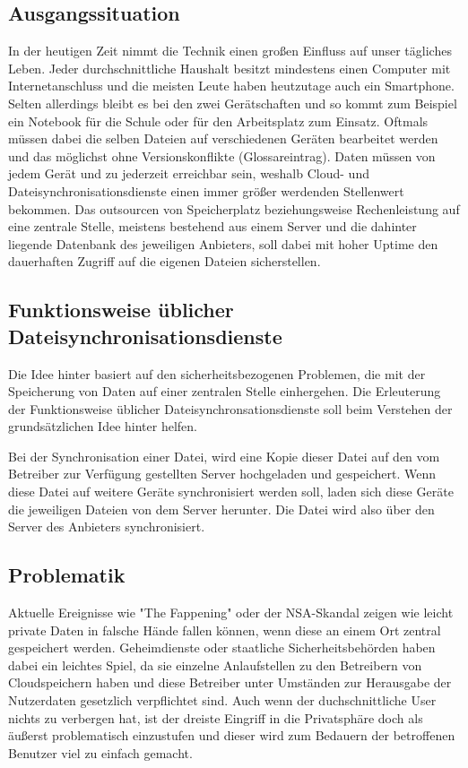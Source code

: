 \subsection{Ausgangssituation}
In der heutigen Zeit nimmt die Technik einen großen Einfluss auf unser tägliches Leben. Jeder durchschnittliche Haushalt besitzt mindestens
einen Computer mit Internetanschluss und die meisten Leute haben heutzutage auch ein Smartphone. Selten allerdings bleibt es bei den zwei
Gerätschaften und so kommt zum Beispiel ein Notebook für die Schule oder für den Arbeitsplatz zum Einsatz. Oftmals müssen dabei die selben
Dateien auf verschiedenen Geräten bearbeitet werden und das möglichst ohne Versionskonflikte (Glossareintrag). Daten müssen von
jedem Gerät und zu jederzeit erreichbar sein, weshalb Cloud- und Dateisynchronisationsdienste einen immer größer werdenden Stellenwert
bekommen. Das outsourcen von Speicherplatz beziehungsweise Rechenleistung auf eine zentrale Stelle, meistens bestehend aus einem Server
und die dahinter liegende Datenbank des jeweiligen Anbieters, soll dabei mit hoher Uptime den dauerhaften Zugriff auf die eigenen Dateien sicherstellen. 

\subsection{Funktionsweise üblicher Dateisynchronisationsdienste}
Die Idee hinter \sblit basiert auf den sicherheitsbezogenen Problemen, die mit der Speicherung von Daten auf einer zentralen Stelle
einhergehen. Die Erleuterung der Funktionsweise üblicher Dateisynchronsationsdienste soll beim Verstehen der grundsätzlichen 
Idee hinter \sblit helfen.

Bei der Synchronisation einer Datei, wird eine Kopie dieser Datei auf den vom Betreiber zur Verfügung gestellten Server hochgeladen und gespeichert.
Wenn diese Datei auf weitere Geräte synchronisiert werden soll, laden sich diese Geräte die jeweiligen Dateien von dem Server herunter. Die Datei wird also über den Server des Anbieters
synchronisiert.

\subsection{Problematik}

Aktuelle Ereignisse wie "The Fappening" oder der NSA-Skandal zeigen wie leicht private Daten in falsche Hände fallen können, wenn diese an einem Ort zentral gespeichert werden. Geheimdienste oder staatliche Sicherheitsbehörden haben dabei ein leichtes Spiel, da sie einzelne Anlaufstellen zu den Betreibern von Cloudspeichern haben und diese Betreiber unter Umständen zur Herausgabe der Nutzerdaten gesetzlich verpflichtet sind. 
Auch wenn der duchschnittliche User nichts zu verbergen hat, ist der dreiste Eingriff in die Privatsphäre doch als äußerst problematisch einzustufen und dieser wird zum Bedauern der betroffenen Benutzer viel zu einfach gemacht.

